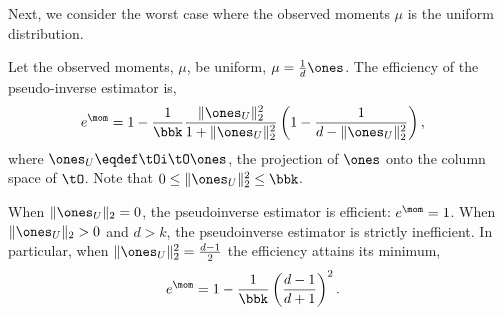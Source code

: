 Next, we consider the worst case where the observed moments $\mu$ is the
uniform distribution.

\begin{lemma}
  Let the observed moments, $\mu$, be uniform, $\mu = \frac{1}{d} \ones$. 
  The efficiency of the pseudo-inverse estimator is, 
  \begin{align}
    e^\mom &= 
    1 - \frac{1}{\bbk}\frac{\|\ones_U\|_2^2}{1 + \|\ones_U\|_2^2} \left( 1 - \frac{1}{d - \|\ones_U\|_2^2} \right),
  \end{align}
  where $\ones_U \eqdef \tOi\tO \ones$, the projection of $\ones$ onto
  the column space of $\tO$. Note that $0 \le \|\ones_U\|^2_2 \le \bbk$.

  When $\|\ones_U\|_2 = 0$, the pseudoinverse estimator is efficient:
  $e^\mom = 1$. When $\|\ones_U\|_2 > 0$ and $d > k$, the pseudoinverse
  estimator is strictly inefficient. In particular, when $\|\ones_U\|^2_2
  = \frac{d-1}{2}$ the efficiency attains its minimum, 
  \begin{align*}
    e^\mom 
    &= 1 - \frac{1}{\bbk} \left( \frac{d-1}{d+1} \right)^2.
  \end{align*}
\end{lemma}
